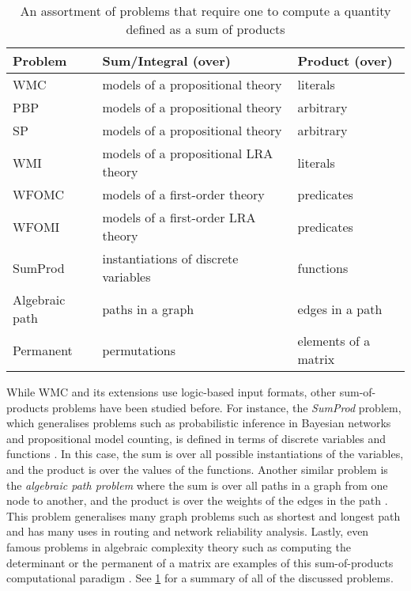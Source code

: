 \begin{table}
  \caption{An assortment of problems that require one to compute a quantity defined as a sum of products}
  \label{table:comparison}
  \centering
  \begin{tabular}{lll}
    \toprule
    Problem & Sum/Integral (over) & Product (over) \\
    \midrule
    WMC & models of a propositional theory & literals \\
    PBP & models of a propositional theory & arbitrary \\
    SP & models of a propositional theory & arbitrary \\
    WMI & models of a propositional LRA theory & literals \\
    WFOMC & models of a first-order theory & predicates \\
    WFOMI & models of a first-order LRA theory & predicates \\
    SumProd & instantiations of discrete variables & functions \\
    Algebraic path & paths in a graph & edges in a path \\
    Permanent & permutations & elements of a matrix \\
    \bottomrule
  \end{tabular}
\end{table}

While WMC and its extensions use logic-based input formats, other sum-of-products problems have been studied before. For instance, the \emph{SumProd} problem, which generalises problems such as probabilistic inference in Bayesian networks and propositional model counting, is defined in terms of discrete variables and functions \citep{DBLP:journals/jair/BacchusDP09,DBLP:journals/ai/Dechter99}. In this case, the sum is over all possible instantiations of the variables, and the product is over the values of the functions. Another similar problem is the \emph{algebraic path problem} where the sum is over all paths in a graph from one node to another, and the product is over the weights of the edges in the path \citep{DBLP:series/synthesis/2010Baras}. This problem generalises many graph problems such as shortest and longest path and has many uses in routing and network reliability analysis. Lastly, even famous problems in algebraic complexity theory such as computing the determinant or the permanent of a matrix are examples of this sum-of-products computational paradigm \citep{DBLP:books/daglib/0090316,DBLP:journals/tcs/Valiant79}. See \cref{table:comparison} for a summary of all of the discussed problems.

